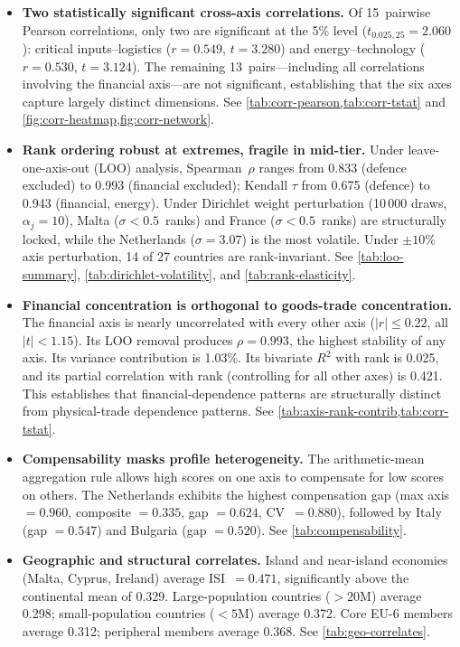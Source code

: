 \begin{itemize}[leftmargin=2em]
\item \textbf{Two statistically significant cross-axis correlations.}
  Of 15~pairwise Pearson correlations, only two are significant at
  the 5\% level ($t_{0.025,25} = 2.060$): critical inputs--logistics
  ($r = 0.549$, $t = 3.280$) and energy--technology ($r = 0.530$,
  $t = 3.124$).  The remaining 13~pairs---including all correlations
  involving the financial axis---are not significant, establishing
  that the six axes capture largely distinct dimensions.
  See \cref{tab:corr-pearson,tab:corr-tstat} and
  \cref{fig:corr-heatmap,fig:corr-network}.

\item \textbf{Rank ordering robust at extremes, fragile in mid-tier.}
  Under leave-one-axis-out (LOO) analysis, Spearman~$\rho$ ranges
  from 0.833 (defence excluded) to 0.993 (financial excluded); Kendall
  $\tau$ from 0.675 (defence) to 0.943 (financial, energy).  Under
  Dirichlet weight perturbation (10\,000 draws, $\alpha_j = 10$),
  Malta ($\sigma < 0.5$~ranks) and France ($\sigma < 0.5$~ranks) are
  structurally locked, while the Netherlands ($\sigma = 3.07$) is the
  most volatile.  Under $\pm10\%$ axis perturbation, 14 of 27
  countries are rank-invariant.
  See \cref{tab:loo-summary}, \cref{tab:dirichlet-volatility}, and
  \cref{tab:rank-elasticity}.

\item \textbf{Financial concentration is orthogonal to goods-trade
  concentration.}
  The financial axis is nearly uncorrelated with every other axis
  ($|r| \leq 0.22$, all $|t| < 1.15$).  Its LOO removal produces
  $\rho = 0.993$, the highest stability of any axis.  Its variance
  contribution is 1.03\%.  Its bivariate $R^2$ with rank is 0.025, and
  its partial correlation with rank (controlling for all other axes) is
  0.421.  This establishes that financial-dependence patterns are
  structurally distinct from physical-trade dependence patterns.
  See \cref{tab:axis-rank-contrib,tab:corr-tstat}.

\item \textbf{Compensability masks profile heterogeneity.}
  The arithmetic-mean aggregation rule allows high scores on one axis
  to compensate for low scores on others.  The Netherlands exhibits the
  highest compensation gap (max axis $= 0.960$, composite $= 0.335$,
  gap $= 0.624$, CV~$= 0.880$), followed by Italy (gap $= 0.547$)
  and Bulgaria (gap $= 0.520$).
  See \cref{tab:compensability}.

\item \textbf{Geographic and structural correlates.}
  Island and near-island economies (Malta, Cyprus, Ireland) average
  ISI~$= 0.471$, significantly above the continental mean of 0.329.
  Large-population countries ($> 20$M) average 0.298; small-population
  countries ($< 5$M) average 0.372.  Core EU-6 members average 0.312;
  peripheral members average 0.368.
  See \cref{tab:geo-correlates}.


\end{itemize}
